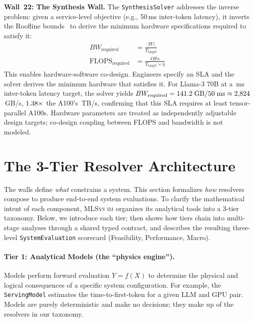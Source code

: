 \documentclass[10pt,twocolumn]{article}
\newcommand{\mlsysim}{\mbox{\textsc{MLSys}\,\textperiodcentered\,\textsc{im}}\xspace}
\begin{document}
\textbf{Wall~22: The Synthesis Wall.} The \texttt{SynthesisSolver} addresses the inverse problem: given a service-level objective (e.g., 50\,ms inter-token latency), it inverts the Roofline bounds~\citep{williams2009} to derive the minimum hardware specifications required to satisfy it:
\begin{align}
\label{eq:synthesis}
BW_{\text{required}} &= \frac{|W|}{T_{\text{target}}} \\
\text{FLOPS}_{\text{required}} &= \frac{\text{OPs}}{T_{\text{target}} \times \eta}
\end{align}
This enables hardware-software co-design. Engineers specify an SLA and the solver derives the minimum hardware that satisfies it. For Llama-3 70B at a \WallTwentyTwoTargetMs\,ms inter-token latency target, the solver yields $BW_{\text{required}} = 141.2\;\text{GB} / 50\;\text{ms} \approx 2{,}824$\,GB/s, $1.38{\times}$ the A100's \RegAhBandwidthTBs\,TB/s, confirming that this SLA requires at least \WallTwentyTwoMinAhDevices{} tensor-parallel A100s. Hardware parameters are treated as independently adjustable design targets; co-design coupling between FLOPS and bandwidth is not modeled.

\section{The 3-Tier Resolver Architecture}
\label{sec:solver-formalism}

The walls define \emph{what} constrains a system. This section formalizes \emph{how} resolvers compose to produce end-to-end system evaluations. To clarify the mathematical intent of each component, \mlsysim organizes its analytical tools into a 3-tier taxonomy. Below, we introduce each tier;  then shows how tiers chain into multi-stage analyses through a shared typed contract, and  describes the resulting three-level \texttt{SystemEvaluation} scorecard (Feasibility, Performance, Macro).

\paragraph{Tier 1: Analytical Models (the ``physics engine'').} Models perform forward evaluation $Y = f(X)$ to determine the physical and logical consequences of a specific system configuration. For example, the \texttt{ServingModel} estimates the time-to-first-token for a given LLM and GPU pair. Models are purely deterministic and make no decisions; they make up \CountResolverModels{} of the \CountResolvers{} resolvers in our taxonomy.
\end{document}
